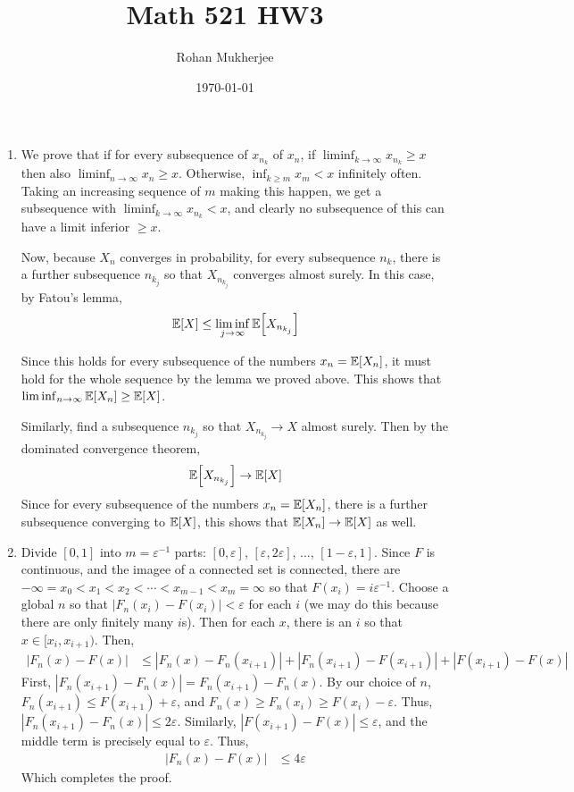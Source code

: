 \documentclass[12pt]{article}
\title{Math 521 HW3}
\date{\today}
\author{Rohan Mukherjee}
\theoremstyle{definitionstyle}
\def\ve{\varepsilon}
\newcommand{\1}{\mathds 1}
\newcommand{\E}{\mathbb E \qty}
\begin{document}
    \maketitle
    \begin{enumerate}
        \item We prove that if for every subsequence of $x_{n_k}$ of $x_n$, if $\liminf_{k \to \infty} x_{n_k} \geq x$ then also $\liminf_{n \to \infty} x_n \geq x$. Otherwise, $\inf_{k \geq m} x_m < x$ infinitely often. Taking an increasing sequence of $m$ making this happen, we get a subsequence with $\liminf_{k \to \infty} x_{n_k} < x$, and clearly no subsequence of this can have a limit inferior $\geq x$. 

        Now, because $X_n$ converges in probability, for every subsequence $n_k$, there is a further subsequence $n_{k_j}$ so that $X_{n_{k_j}}$ converges almost surely. In this case, by Fatou's lemma,
        \begin{align*}
            \E[X] \leq \liminf_{j \to \infty} \E[X_{n_{k_j}}]
        \end{align*}

        Since this holds for every subsequence of the numbers $x_n = \E[X_n]$, it must hold for the whole sequence by the lemma we proved above. This shows that $\liminf_{n \to \infty} \E[X_n] \geq \E[X]$. 

        Similarly, find a subsequence $n_{k_j}$ so that $X_{n_{k_j}} \to X$ almost surely. Then by the dominated convergence theorem,
        \begin{align*}
            \E[X_{n_{k_j}}] \to \E[X]
        \end{align*}
        Since for every subsequence of the numbers $x_n = \E[X_n]$, there is a further subsequence converging to $\E[X]$, this shows that $\E[X_n] \to \E[X]$ as well.
        \newpage
        \item Divide $[0,1]$ into $m = \ve^{-1}$ parts: $[0, \ve]$, $[\ve, 2\ve]$, $\ldots$, $[1-\ve, 1]$. Since $F$ is continuous, and the imagee of a connected set is connected, there are $-\infty = x_0 < x_1 < x_2 < \cdots < x_{m-1} < x_m = \infty$ so that $F(x_i) = i\ve^{-1}$. Choose a global $n$ so that $|F_n(x_i) - F(x_i)| < \ve$ for each $i$ (we may do this because there are only finitely many $i$s). Then for each $x$, there is an $i$ so that $x \in [x_i, x_{i+1})$. Then,
        \begin{align*}
            |F_n(x) - F(x)| &\leq |F_n(x) - F_n(x_{i+1})| + |F_n(x_{i+1}) - F(x_{i+1})| + |F(x_{i+1}) - F(x)|
        \end{align*}
        First, $|F_n(x_{i+1}) - F_n(x)| = F_n(x_{i+1}) - F_n(x)$. By our choice of $n$, $F_n(x_{i+1}) \leq F(x_{i+1}) + \ve$, and $F_n(x) \geq F_n(x_i) \geq F(x_i) - \ve$. Thus, $|F_n(x_{i+1}) - F_n(x)| \leq 2\ve$. Similarly, $|F(x_{i+1}) - F(x)| \leq \ve$, and the middle term is precisely equal to $\ve$. Thus,
        \begin{align*}
            |F_n(x) - F(x)| &\leq 4\ve
        \end{align*}
        Which completes the proof.


\end{enumerate}
\end{document}
